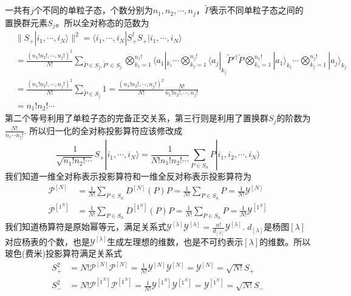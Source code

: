 \documentclass[12pt]{article}
\begin{document}
一共有$j$个不同的单粒子态，个数分别为$n_1,n_2,\cdots,n_j$，$\tilde{P}$表示不同单粒子态之间的置换群元素$S_j$。所以全对称态的范数为
\begin{equation*}
    \begin{split}
        &\|S_+|i_1,\cdots,i_N\rangle\|^2=\langle i_1,\cdots,i_N|S_+^\dagger S_+|i_1,\cdots,i_N\rangle\\
        &=\frac{(n_1!n_2!,\cdots,n_j!)^2}{N!}\sum_{\tilde{P}\in S_j,\tilde{P}'\in S_j}\bigotimes_{k_1=1}^{n_1!}\langle a_1|_{k_1}\cdots\bigotimes_{k_j=1}^{n_j!}\langle a_j|_{k_j}\tilde{P}'^\dagger\tilde{P}\bigotimes_{k_1=1}^{n_1!}|a_1\rangle_{k_1}\cdots\bigotimes_{k_j=1}^{n_j!}|a_j\rangle_{k_j}\\
        &=\frac{(n_1!n_2!,\cdots,n_j!)^2}{N!}\sum_{\tilde{P}\in S_j}1=\frac{(n_1!n_2!,\cdots,n_j!)^2}{N!}\frac{N!}{n_1!n_2!,\cdots,n_j!}\\
        &=n_1!n_2!\cdots
    \end{split}
\end{equation*}
第二个等号利用了单粒子态的完备正交关系，第三行则是利用了置换群$S_j$的阶数为$\frac{N!}{n_1\cdots n_j!}$. 所以归一化的全对称投影算符应该修改成
\begin{equation*}
    \frac{1}{\sqrt{n_1!n_2!\cdots}}S_+|i_1,\cdots,i_N\rangle=\frac{1}{N!n_1!n_2!\cdots}\sum_{P\in S_n}P|i_1,i_2,\cdots,i_N\rangle
\end{equation*}
我们知道一维全对称表示投影算符和一维全反对称表示投影算符为
\begin{equation*}
    \begin{split}
        \mathcal{P}^{[N]}&=\frac{1}{N!}\sum_{P\in S_n}D^{[N]}(P)P=\frac{1}{N!}\sum_{P\in S_n}P=\frac{1}{N!}\mathcal{Y}^{[N]}\\
        \mathcal{P}^{[1^N]}&=\frac{1}{N!}\sum_{P\in S_n}D^{[1^N]}(P)P=\frac{1}{N!}\sum_{P\in S_n}P=\frac{1}{N!}\mathcal{Y}^{[1^N]}
    \end{split}
\end{equation*}
我们知道杨算符是原始幂等元，满足关系式$\mathcal{Y}^{[\lambda]}\mathcal{Y}^{[\lambda]}=\frac{n!}{d_{[\lambda]}}\mathcal{Y}^{[\lambda]}$. $d_{[\lambda]}$是杨图$[\lambda]$对应杨表的个数，也是$\mathcal{Y}^{[\lambda]}$生成左理想的维数，也是不可约表示$[\lambda]$的维数。所以玻色(费米)投影算符满足关系式
\begin{equation*}
    \begin{split}
        S_{+}^2&=N!\mathcal{P}^{[N]}\mathcal{P}^{[N]}=\frac{1}{N!}\mathcal{Y}^{[N]}\mathcal{Y}^{[N]}=\mathcal{Y}^{[N]}=\sqrt{N!}S_+\\
        S_{-}^2&=N!\mathcal{P}^{[1^N]}\mathcal{P}^{[1^N]}=\frac{1}{N!}\mathcal{Y}^{[1^N]}\mathcal{Y}^{[1^N]}=\mathcal{Y}^{[1^N]}=\sqrt{N!}S_-
    \end{split}
\end{equation*}
\end{document}
